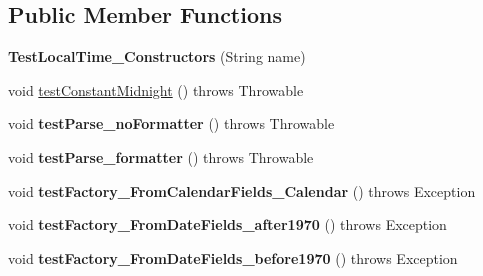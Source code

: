 \subsection*{Public Member Functions}
\begin{DoxyCompactItemize}
\item 
\hypertarget{classorg_1_1joda_1_1time_1_1_test_local_time___constructors_a8a3cb4fe77aad008d3b93fd4c9db473a}{{\bfseries Test\-Local\-Time\-\_\-\-Constructors} (String name)}\label{classorg_1_1joda_1_1time_1_1_test_local_time___constructors_a8a3cb4fe77aad008d3b93fd4c9db473a}

\item 
void \hyperlink{classorg_1_1joda_1_1time_1_1_test_local_time___constructors_a2c87cd30fdea0d1783f54017259862aa}{test\-Constant\-Midnight} ()  throws Throwable 
\item 
\hypertarget{classorg_1_1joda_1_1time_1_1_test_local_time___constructors_a1cd61bf6a336b30552850fdb78293681}{void {\bfseries test\-Parse\-\_\-no\-Formatter} ()  throws Throwable }\label{classorg_1_1joda_1_1time_1_1_test_local_time___constructors_a1cd61bf6a336b30552850fdb78293681}

\item 
\hypertarget{classorg_1_1joda_1_1time_1_1_test_local_time___constructors_a2cc92ee98eee5bb6dfb83dd3b8e7399e}{void {\bfseries test\-Parse\-\_\-formatter} ()  throws Throwable }\label{classorg_1_1joda_1_1time_1_1_test_local_time___constructors_a2cc92ee98eee5bb6dfb83dd3b8e7399e}

\item 
\hypertarget{classorg_1_1joda_1_1time_1_1_test_local_time___constructors_a05da094c4eb842b87cec0273a3789b17}{void {\bfseries test\-Factory\-\_\-\-From\-Calendar\-Fields\-\_\-\-Calendar} ()  throws Exception }\label{classorg_1_1joda_1_1time_1_1_test_local_time___constructors_a05da094c4eb842b87cec0273a3789b17}

\item 
\hypertarget{classorg_1_1joda_1_1time_1_1_test_local_time___constructors_ab02b76bec4616ebd1a2ca77397f93966}{void {\bfseries test\-Factory\-\_\-\-From\-Date\-Fields\-\_\-after1970} ()  throws Exception }\label{classorg_1_1joda_1_1time_1_1_test_local_time___constructors_ab02b76bec4616ebd1a2ca77397f93966}

\item 
\hypertarget{classorg_1_1joda_1_1time_1_1_test_local_time___constructors_ae4b3de0578399bc66cf5170446f9f0c5}{void {\bfseries test\-Factory\-\_\-\-From\-Date\-Fields\-\_\-before1970} ()  throws Exception }\label{classorg_1_1joda_1_1time_1_1_test_local_time___constructors_ae4b3de0578399bc66cf5170446f9f0c5}


\end{DoxyCompactItemize}
